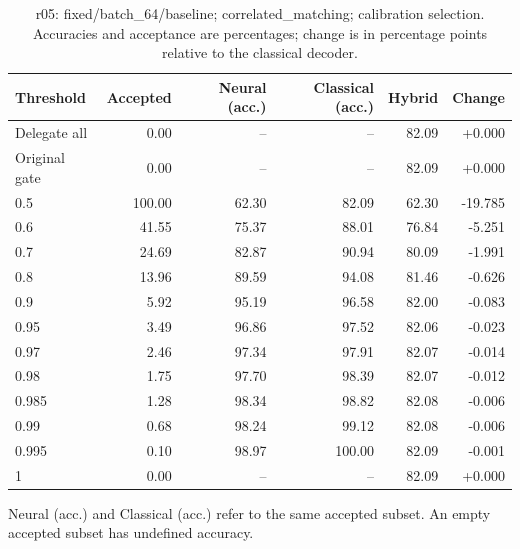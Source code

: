 \begin{table}[htbp]
\centering\small
\setlength{\tabcolsep}{3pt}
\caption{r05: fixed/batch\_64/baseline; correlated\_matching; calibration selection. Accuracies and acceptance are percentages; change is in percentage points relative to the classical decoder.}
\begin{tabular}{lrrrrr}
\toprule
Threshold & Accepted & Neural (acc.) & Classical (acc.) & Hybrid & Change \\
\midrule
Delegate all & 0.00 & -- & -- & 82.09 & +0.000 \\
Original gate & 0.00 & -- & -- & 82.09 & +0.000 \\
0.5 & 100.00 & 62.30 & 82.09 & 62.30 & -19.785 \\
0.6 & 41.55 & 75.37 & 88.01 & 76.84 & -5.251 \\
0.7 & 24.69 & 82.87 & 90.94 & 80.09 & -1.991 \\
0.8 & 13.96 & 89.59 & 94.08 & 81.46 & -0.626 \\
0.9 & 5.92 & 95.19 & 96.58 & 82.00 & -0.083 \\
0.95 & 3.49 & 96.86 & 97.52 & 82.06 & -0.023 \\
0.97 & 2.46 & 97.34 & 97.91 & 82.07 & -0.014 \\
0.98 & 1.75 & 97.70 & 98.39 & 82.07 & -0.012 \\
0.985 & 1.28 & 98.34 & 98.82 & 82.08 & -0.006 \\
0.99 & 0.68 & 98.24 & 99.12 & 82.08 & -0.006 \\
0.995 & 0.10 & 98.97 & 100.00 & 82.09 & -0.001 \\
1 & 0.00 & -- & -- & 82.09 & +0.000 \\
\bottomrule
\end{tabular}
\par\smallskip\footnotesize Neural (acc.) and Classical (acc.) refer to the same accepted subset. An empty accepted subset has undefined accuracy.
\end{table}
